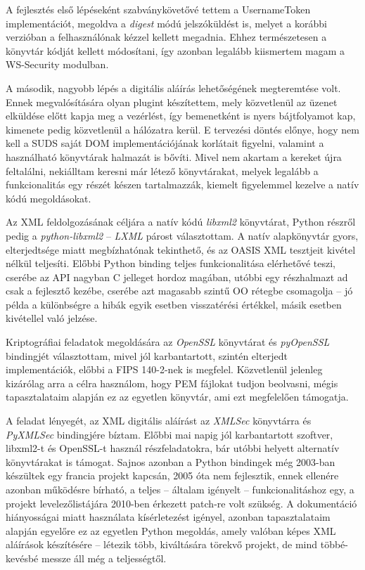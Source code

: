 \bigskip

A fejlesztés első lépéseként szabványkövetővé tettem a UsernameToken implementációt, megoldva a \emph{digest} módú jelszóküldést is, melyet a korábbi verzióban a felhasználónak kézzel kellett megadnia. Ehhez természetesen a könyvtár kódját kellett módosítani, így azonban legalább kiismertem magam a WS\hyp{}Security modulban.

A második, nagyobb lépés a digitális aláírás lehetőségének megteremtése volt. Ennek megvalósítására olyan plugint készítettem, mely közvetlenül az üzenet elküldése előtt kapja meg a vezérlést, így bemenetként is nyers bájtfolyamot kap, kimenete pedig közvetlenül a hálózatra kerül. E tervezési döntés előnye, hogy nem kell a SUDS saját DOM implementációjának korlátait figyelni, valamint a használható könyvtárak halmazát is bővíti. Mivel nem akartam a kereket újra feltalálni, nekiálltam keresni már létező könyvtárakat, melyek legalább a funkcionalitás egy részét készen tartalmazzák, kiemelt figyelemmel kezelve a natív kódú megoldásokat.

Az XML feldolgozásának céljára a natív kódú \emph{libxml2} könyvtárat, Python részről pedig a \emph{python-libxml2} -- \emph{LXML} párost választottam. A natív alapkönyvtár gyors, elterjedtsége miatt megbízhatónak tekinthető, és az OASIS XML tesztjeit kivétel nélkül teljesíti. Előbbi Python binding teljes funkcionalitása elérhetővé teszi, cserébe az API nagyban C jelleget hordoz magában, utóbbi egy részhalmazt ad csak a fejlesztő kezébe, cserébe azt magasabb szintű OO rétegbe csomagolja -- jó példa a különbségre a hibák egyik esetben visszatérési értékkel, másik esetben kivétellel való jelzése.

Kriptográfiai feladatok megoldására az \emph{OpenSSL} könyvtárat és \emph{pyOpenSSL} bindingjét választottam, mivel jól karbantartott, szintén elterjedt implementációk, előbbi a FIPS 140-2-nek is megfelel. Közvetlenül jelenleg kizárólag arra a célra használom, hogy PEM fájlokat tudjon beolvasni, mégis tapasztalataim alapján ez az egyetlen könyvtár, ami ezt megfelelően támogatja.

A feladat lényegét, az XML digitális aláírást az \emph{XMLSec} könyvtárra és \emph{PyXMLSec} bindingjére bíztam. Előbbi mai napig jól karbantartott szoftver, libxml2-t és OpenSSL-t használ részfeladatokra, bár utóbbi helyett alternatív könyvtárakat is támogat. Sajnos azonban a Python bindingek még 2003-ban készültek egy francia projekt kapcsán, 2005 óta nem fejlesztik, ennek ellenére azonban működésre bírható, a teljes -- általam igényelt -- funkcionalitáshoz egy, a projekt levelezőlistájára 2010-ben érkezett patch-re volt szükség. A dokumentáció hiányosságai miatt használata kísérletezést igényel, azonban tapasztalataim alapján egyelőre ez az egyetlen Python megoldás, amely valóban képes XML aláírások készítésére -- létezik több, kiváltására törekvő projekt, de mind többé-kevésbé messze áll még a teljességtől.


